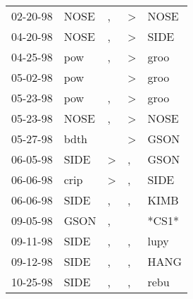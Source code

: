 \begin{supertabular}{p{0.07\textwidth}p{0.06\textwidth}p{0.02\textwidth}p{0.02\textwidth}p{0.06\textwidth}}
 02-20-98\textsuperscript{} &           NOSE\textsuperscript{} &                , &     \textgreater &           NOSE\textsuperscript{} \\
 04-20-98\textsuperscript{} &           NOSE\textsuperscript{} &                , &     \textgreater &           SIDE\textsuperscript{} \\
 04-25-98\textsuperscript{} &            pow\textsuperscript{} &                , &     \textgreater &           groo\textsuperscript{} \\
 05-02-98\textsuperscript{} &            pow\textsuperscript{} &                  &     \textgreater &           groo\textsuperscript{} \\
 05-23-98\textsuperscript{} &            pow\textsuperscript{} &                , &     \textgreater &           groo\textsuperscript{} \\
 05-23-98\textsuperscript{} &           NOSE\textsuperscript{} &                , &     \textgreater &           NOSE\textsuperscript{} \\
 05-27-98\textsuperscript{} &           bdth\textsuperscript{} &                  &     \textgreater &           GSON\textsuperscript{} \\
 06-05-98\textsuperscript{} &           SIDE\textsuperscript{} &     \textgreater &                , &           GSON\textsuperscript{} \\
 06-06-98\textsuperscript{} &           crip\textsuperscript{} &     \textgreater &                , &           SIDE\textsuperscript{} \\
 06-06-98\textsuperscript{} &           SIDE\textsuperscript{} &                , &                , &           KIMB\textsuperscript{} \\
 09-05-98\textsuperscript{} &           GSON\textsuperscript{} &                , &                  &                            *CS1* \\
 09-11-98\textsuperscript{} &           SIDE\textsuperscript{} &                , &                , &           lupy\textsuperscript{} \\
 09-12-98\textsuperscript{} &           SIDE\textsuperscript{} &                , &                , &           HANG\textsuperscript{} \\
 10-25-98\textsuperscript{} &           SIDE\textsuperscript{} &                , &                , &           rebu\textsuperscript{} \\

\end{supertabular}
